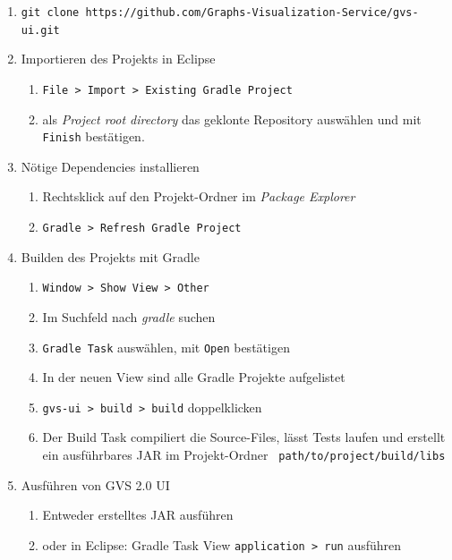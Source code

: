 \documentclass[11pt,a4paper,english,oneside]{book}
\numberwithin{equation}{chapter}
\begin{document}
	\begin{enumerate}
		\item \lstinline{git clone https://github.com/Graphs-Visualization-Service/gvs-ui.git}
		\item Importieren des Projekts in Eclipse
		\begin{enumerate}
			\item \lstinline{File > Import > Existing Gradle Project}
			\item als \textit{Project root directory} das geklonte Repository auswählen und mit \lstinline{Finish} bestätigen.
		\end{enumerate}
		\item Nötige Dependencies installieren
		\begin{enumerate}
			\item Rechtsklick auf den Projekt-Ordner im \textit{Package Explorer}
			\item \lstinline{Gradle > Refresh Gradle Project}
		\end{enumerate}
		\item Builden des Projekts mit Gradle
		\begin{enumerate}
			\item \lstinline{Window > Show View > Other}
			\item Im Suchfeld nach \textit{gradle} suchen
			\item \lstinline{Gradle Task} auswählen, mit \lstinline{Open} bestätigen
			\item In der neuen View sind alle Gradle Projekte aufgelistet
			\item \lstinline{gvs-ui > build > build} doppelklicken
			\item Der Build Task compiliert die Source-Files, lässt Tests laufen und erstellt ein ausführbares JAR im Projekt-Ordner \lstinline{ path/to/project/build/libs}
		\end{enumerate}
		\item Ausführen von GVS 2.0 UI
		\begin{enumerate}
			\item Entweder erstelltes JAR ausführen
			\item oder in Eclipse: Gradle Task View \lstinline{application > run} ausführen
		\end{enumerate}
	\end{enumerate}
		
\end{document}
